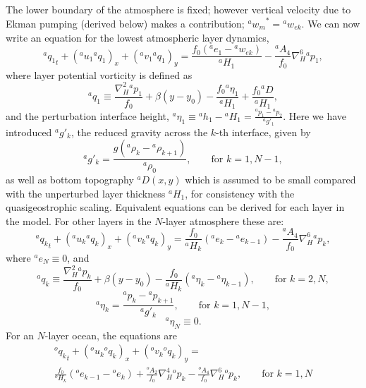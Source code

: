 \documentclass[11pt, a4paper,twoside]{article}
\newcommand{\etb}[2]{{{}^{#1}\eta_{#2}}}
\newcommand{\rhb}[1]{{{}^{#1}\rho}}
\newcommand{\gp}[2]{{}^{#1}g'_{#2}}
\newcommand{\q}[2]{{{}^{#1}q_{#2}}}
\newcommand{\p}[2]{{{}^{#1}p_{#2}}}
\newcommand{\uu}[2]{{{}^{#1}u_{#2}}}
\newcommand{\vv}[2]{{{}^{#1}v_{#2}}}
\newcommand{\ww}[2]{{{}^{#1}w_{#2}}}
\newcommand{\ek}[1]{{{}^{#1}w_{ek}}}
\newcommand{\HH}[2]{{{}^{#1}H_{#2}}}
\newcommand{\at}[1]{{{}^{#1}A_2}}
\newcommand{\ah}[1]{{{}^{#1}A_4}}
\newcommand{\e}[2]{{{}^{#1}e_{#2}}}
\newcommand{\h}[2]{{{}^{#1}h_{#2}}}
\newcommand{\D}[1]{{}^{#1}D}
\numberwithin{equation}{section}
\begin{document}
\subsection{}
The lower boundary of the atmosphere is fixed; however vertical velocity due to Ekman pumping (derived below) makes a contribution; $\ww{a}{m}^* = \ek{a}$.
We can now write an equation for the lowest atmospheric layer dynamics,
\begin{equation}\label{eq:momxl}
\q{a}{1}_t  + \left(\uu{a}{1}  \q{a}{1} \right)_x  + \left(\vv{a}{1}\q{a}{1} \right)_y  = \frac{f_0 (\e{a}{1} -\ek{a})}{\HH{a}{1}} - \frac{\ah{a}}{f_0}\nabla_H^6 \p{a}{1},
\end{equation}
where layer potential vorticity is defined as
\begin{equation}\label{eq:qa1}
\q{a}{1} \equiv \frac{\nabla_H^2 \p{a}{1}}{f_0} + \beta(y-y_0) - \frac{ f_0 \etb{a}{1} }{\HH{a}{1}} + \frac{f_0 \D{a}}{\HH{a}{1}},
\end{equation}
and the perturbation interface height, $\etb{a}{1} \equiv \h{a}{1} - \HH{a}{1} =  \frac{\p{a}{1}-\p{a}{2}}{\gp{a}{1}}$.
Here we have introduced $\gp{a}{k}$, the reduced gravity across the $k$-th interface, given by
\[\gp{a}{k} = \frac{g(\rhb{a}_k - \rhb{a}_{k+1})}{\rhb{a}_0},\quad \quad \textrm{for } k=1,N-1,\]
as well as bottom topography $\D{a}(x,y)$ which is assumed to be small compared with the unperturbed layer thickness $\HH{a}{1}$, for consistency with the quasigeostrophic scaling.
Equivalent equations can be derived for each layer in the model.
For other layers in the $N$-layer atmosphere these are:
\begin{equation}\label{eq:momxra}
\q{a}{k}_t  + (\uu{a}{k} \q{a}{k})_x  + (\vv{a}{k} \q{a}{k})_y   = \frac{f_0}{\HH{a}{k}}( \e{a}{k}- \e{a}{k-1})  - \frac{\ah{a}}{f_0}\nabla_H^6 \p{a}{k},
\end{equation}
where $\e{a}{N} \equiv 0$, and
\begin{equation}
\q{a}{k} \equiv \frac{\nabla_H^2 \p{a}{k}}{f_0} + \beta(y-y_0) - \frac{ f_0  }{\HH{a}{k}}(\etb{a}{k} - \etb{a}{k-1}), \quad \quad \textrm{for } k=2,N,
\end{equation}
\begin{equation}
\etb{a}{k} =   \frac{\p{a}{k}-\p{a}{k+1}}{\gp{a}{k}}, \quad \quad \textrm{for } k=1,N-1,
\end{equation}
\begin{equation}
\etb{a}{N} \equiv  0.
\end{equation}
For an $N$-layer ocean, the equations are
\begin{multline}\label{eq:momxn1}
\q{o}{k}_t  + (\uu{o}{k} \q{o}{k})_x  + (\vv{o}{k} \q{o}{k})_y = \\
\frac{f_0 }{\HH{o}{k}}(\e{o}{k-1} - \e{o}{k}) + \frac{\at{o}}{f_0}\nabla_H^4 \p{o}{k}  - \frac{\ah{o}}{f_0}\nabla_H^6 \p{o}{k}, \quad \quad \textrm{for } k=1,N
\end{multline}
\end{document}
